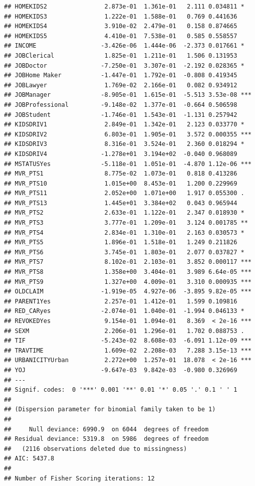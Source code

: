 \documentclass[]{article}
\begin{document}
\begin{verbatim}
## HOMEKIDS2                2.873e-01  1.361e-01   2.111 0.034811 *  
## HOMEKIDS3                1.222e-01  1.588e-01   0.769 0.441636    
## HOMEKIDS4                3.910e-02  2.479e-01   0.158 0.874665    
## HOMEKIDS5                4.410e-01  7.538e-01   0.585 0.558557    
## INCOME                  -3.426e-06  1.444e-06  -2.373 0.017661 *  
## JOBClerical              1.825e-01  1.211e-01   1.506 0.131953    
## JOBDoctor               -7.250e-01  3.307e-01  -2.192 0.028365 *  
## JOBHome Maker           -1.447e-01  1.792e-01  -0.808 0.419345    
## JOBLawyer                1.769e-02  2.166e-01   0.082 0.934912    
## JOBManager              -8.905e-01  1.615e-01  -5.513 3.53e-08 ***
## JOBProfessional         -9.148e-02  1.377e-01  -0.664 0.506598    
## JOBStudent              -1.746e-01  1.543e-01  -1.131 0.257942    
## KIDSDRIV1                2.849e-01  1.342e-01   2.123 0.033770 *  
## KIDSDRIV2                6.803e-01  1.905e-01   3.572 0.000355 ***
## KIDSDRIV3                8.316e-01  3.524e-01   2.360 0.018294 *  
## KIDSDRIV4               -1.278e+01  3.194e+02  -0.040 0.968089    
## MSTATUSYes              -5.118e-01  1.051e-01  -4.870 1.12e-06 ***
## MVR_PTS1                 8.775e-02  1.073e-01   0.818 0.413286    
## MVR_PTS10                1.015e+00  8.453e-01   1.200 0.229969    
## MVR_PTS11                2.052e+00  1.071e+00   1.917 0.055300 .  
## MVR_PTS13                1.445e+01  3.384e+02   0.043 0.965944    
## MVR_PTS2                 2.633e-01  1.122e-01   2.347 0.018930 *  
## MVR_PTS3                 3.777e-01  1.209e-01   3.124 0.001785 ** 
## MVR_PTS4                 2.834e-01  1.310e-01   2.163 0.030573 *  
## MVR_PTS5                 1.896e-01  1.518e-01   1.249 0.211826    
## MVR_PTS6                 3.745e-01  1.803e-01   2.077 0.037827 *  
## MVR_PTS7                 8.102e-01  2.103e-01   3.852 0.000117 ***
## MVR_PTS8                 1.358e+00  3.404e-01   3.989 6.64e-05 ***
## MVR_PTS9                 1.327e+00  4.009e-01   3.310 0.000935 ***
## OLDCLAIM                -1.919e-05  4.927e-06  -3.895 9.82e-05 ***
## PARENT1Yes               2.257e-01  1.412e-01   1.599 0.109816    
## RED_CARyes              -2.074e-01  1.040e-01  -1.994 0.046133 *  
## REVOKEDYes               9.154e-01  1.094e-01   8.369  < 2e-16 ***
## SEXM                     2.206e-01  1.296e-01   1.702 0.088753 .  
## TIF                     -5.243e-02  8.608e-03  -6.091 1.12e-09 ***
## TRAVTIME                 1.609e-02  2.208e-03   7.288 3.15e-13 ***
## URBANICITYUrban          2.272e+00  1.257e-01  18.078  < 2e-16 ***
## YOJ                     -9.647e-03  9.842e-03  -0.980 0.326969    
## ---
## Signif. codes:  0 '***' 0.001 '**' 0.01 '*' 0.05 '.' 0.1 ' ' 1
## 
## (Dispersion parameter for binomial family taken to be 1)
## 
##     Null deviance: 6990.9  on 6044  degrees of freedom
## Residual deviance: 5319.8  on 5986  degrees of freedom
##   (2116 observations deleted due to missingness)
## AIC: 5437.8
## 
## Number of Fisher Scoring iterations: 12
\end{verbatim}
\end{document}
